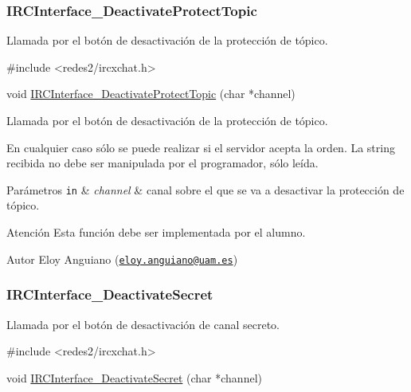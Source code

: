  \hypertarget{IRCInterface_DeactivateProtectTopic}{}\subsubsection{I\+R\+C\+Interface\+\_\+\+Deactivate\+Protect\+Topic}\label{IRCInterface_DeactivateProtectTopic}
Llamada por el botón de desactivación de la protección de tópico.


\begin{DoxyCode}
\textcolor{preprocessor}{#include <redes2/ircxchat.h>}

\textcolor{keywordtype}{void} \hyperlink{G-2313-06-P2__client_8c_a5a57541a950f8c2c40b4b44c32b28ed9}{IRCInterface\_DeactivateProtectTopic} (\textcolor{keywordtype}{char} *channel)
\end{DoxyCode}


Llamada por el botón de desactivación de la protección de tópico.

En cualquier caso sólo se puede realizar si el servidor acepta la orden. La string recibida no debe ser manipulada por el programador, sólo leída.


\begin{DoxyParams}[1]{Parámetros}
\mbox{\tt in}  & {\em channel} & canal sobre el que se va a desactivar la protección de tópico.\\
\hline
\end{DoxyParams}
\begin{DoxyWarning}{Atención}
Esta función debe ser implementada por el alumno.
\end{DoxyWarning}
\begin{DoxyAuthor}{Autor}
Eloy Anguiano (\href{mailto:eloy.anguiano@uam.es}{\tt eloy.\+anguiano@uam.\+es})
\end{DoxyAuthor}


 \hypertarget{IRCInterface_DeactivateSecret}{}\subsubsection{I\+R\+C\+Interface\+\_\+\+Deactivate\+Secret}\label{IRCInterface_DeactivateSecret}
Llamada por el botón de desactivación de canal secreto.


\begin{DoxyCode}
\textcolor{preprocessor}{#include <redes2/ircxchat.h>}

\textcolor{keywordtype}{void} \hyperlink{G-2313-06-P2__client_8c_a4956427664cabc7d5b2bd1589a207324}{IRCInterface\_DeactivateSecret} (\textcolor{keywordtype}{char} *channel)
\end{DoxyCode}


